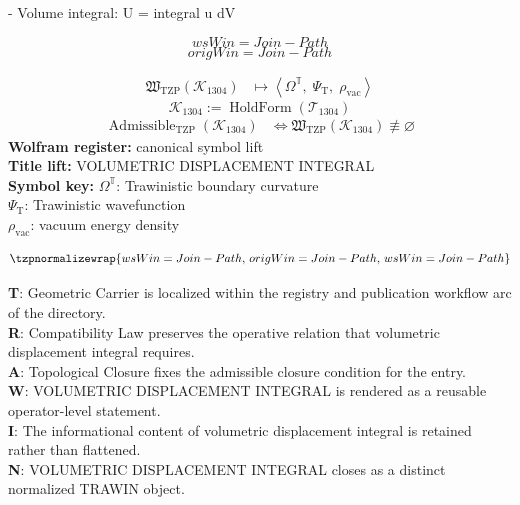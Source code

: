 
\begin{tzpsnapshot}
\end{tzpsnapshot}

- Volume integral: U = integral u dV

\[
wsWin = Join-Path
\]
\[
origWin = Join-Path
\]

\noindent
\begin{minipage}[t]{0.48\linewidth}
\begingroup
\small
\[
\begin{aligned}
\mathfrak{W}_{\mathrm{TZP}}\!\left(\mathcal{K}_{1304}\right)
&\longmapsto
\left\langle \Omega^{\mathbb{T}},\; \Psi_{\mathrm{T}},\; \rho_{\mathrm{vac}} \right\rangle
\end{aligned}
\]
\[
\mathcal{K}_{1304}
:=
\operatorname{HoldForm}\!\left(\mathcal{T}_{1304}\right)
\]
\[
\begin{aligned}
\operatorname{Admissible}_{\mathrm{TZP}}\!\left(\mathcal{K}_{1304}\right)
&\Longleftrightarrow
\mathfrak{W}_{\mathrm{TZP}}\!\left(\mathcal{K}_{1304}\right)\not\equiv\varnothing
\end{aligned}
\]
\textbf{Wolfram register:} canonical symbol lift\\
\textbf{Title lift:} VOLUMETRIC DISPLACEMENT INTEGRAL\\
\textbf{Symbol key:} \(\Omega^{\mathbb{T}}\): Trawinistic boundary curvature\\ \(\Psi_{\mathrm{T}}\): Trawinistic wavefunction\\ \(\rho_{\mathrm{vac}}\): vacuum energy density
\par
\endgroup
\end{minipage}\hfill
\begin{minipage}[t]{0.48\linewidth}
\[
\tzpnormalizewrap{wsWin = Join-Path,\,origWin = Join-Path,\,wsWin = Join-Path}
\]

\small
\textbf{T}: Geometric Carrier is localized within the registry and publication workflow arc of the directory.\\
\textbf{R}: Compatibility Law preserves the operative relation that volumetric displacement integral requires.\\
\textbf{A}: Topological Closure fixes the admissible closure condition for the entry.\\
\textbf{W}: VOLUMETRIC DISPLACEMENT INTEGRAL is rendered as a reusable operator-level statement.\\
\textbf{I}: The informational content of volumetric displacement integral is retained rather than flattened.\\
\textbf{N}: VOLUMETRIC DISPLACEMENT INTEGRAL closes as a distinct normalized TRAWIN object.
\normalsize
\end{minipage}

